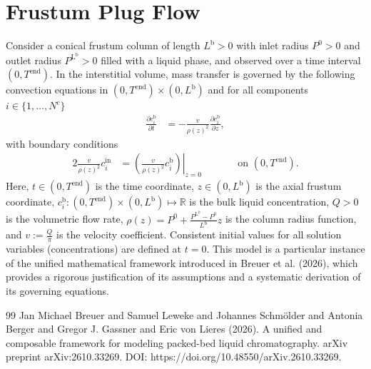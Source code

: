 \documentclass{article}
\begin{document}
\section*{Frustum Plug Flow}
Consider a conical frustum column of length $L^{\mathrm{b}} > 0$ with inlet radius $P^{\mathrm{0}} > 0$ and outlet radius $P^{\mathrm{L^{\mathrm{b}}}} > 0$ filled with a liquid phase, and observed over a time interval $(0, T^{\mathrm{end}})$.
In the interstitial volume, mass transfer is governed by the following convection equations in $(0, T^{\mathrm{end}})\times (0, L^{\mathrm{b}})$ and for all components $i\in\{1, \dots, N^{\mathrm{c}} \}$
\begin{align}
    \frac{\partial c^{\mathrm{b}}_{i}}{\partial t}
    &= - \frac{v}{\rho(z)^{2}} \frac{\partial c^{\mathrm{b}}_{i}}{\partial z},
\end{align}
with boundary conditions
\begin{alignat}{2}
    \frac{v}{\rho(z)^{2}} c^{\mathrm{in}}_{i}
    &= \left.\left( \frac{v}{\rho(z)^{2}} c^{\mathrm{b}}_{i} \right)\right|_{z=0}
    & & \qquad\text{on }(0, T^{\mathrm{end}}).
\end{alignat}
Here, $t\in (0, T^{\mathrm{end}})$ is the time coordinate, $z\in (0, L^{\mathrm{b}})$ is the axial frustum coordinate, $c^{\mathrm{b}}_{i}\colon (0, T^{\mathrm{end}})\times (0, L^{\mathrm{b}}) \mapsto \mathbb{R}$ is the bulk liquid concentration, $Q> 0$ is the volumetric flow rate, $\rho(z) = P^{\mathrm{0}} + \frac{P^{\mathrm{L^{\mathrm{b}}}} - P^{\mathrm{0}}}{L^{\mathrm{b}}} z$ is the column radius function, and $v:= \frac{Q}{\pi}$ is the velocity coefficient.
Consistent initial values for all solution variables (concentrations) are defined at $t = 0$.
This model is a particular instance of the unified mathematical framework introduced in Breuer et al. (2026), which provides a rigorous justification of its assumptions and a systematic derivation of its governing equations.
\begin{thebibliography}{99}
     Jan Michael Breuer and Samuel Leweke and Johannes Schmölder and Antonia Berger and Gregor J. Gassner and Eric von Lieres (2026). A unified and composable framework for modeling packed-bed liquid chromatography. arXiv preprint arXiv:2610.33269. DOI: https://doi.org/10.48550/arXiv.2610.33269.
\end{thebibliography}
\end{document}
